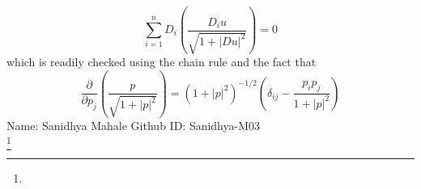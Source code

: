 \begin{equation}
    \sum\limits_{i = 1}^n {{D_i}} \left( {\frac{{{D_i}u}}{{\sqrt {1 + |Du{|^2}} }}} \right) = 0
\end{equation}
which is readily checked using the chain rule and the fact that
\begin{equation}
    \frac{\partial }{{\partial {p_j}}}\left( {\frac{p}{{\sqrt {1 + |p{|^2}} }}} \right) = {\left( {1 + |p{|^2}} \right)^{ - 1/2}}\left( {{\delta _{ij}} - \frac{{{p_i}{p_j}}}{{1 + |p{|^2}}}} \right)
\end{equation}
Name: Sanidhya Mahale Github ID: Sanidhya-M03
\\
\footnote{
}
